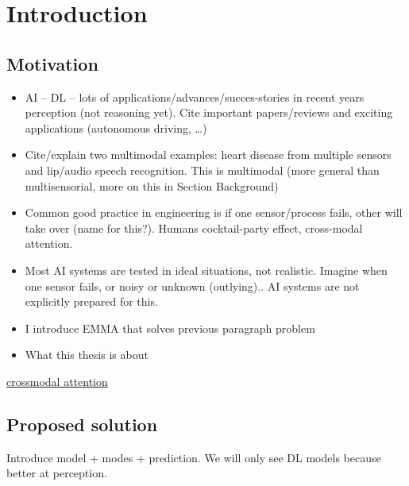 
\chapter{Introduction} 
\label{chapter-1} 


\section{Motivation}

\begin{itemize}
\item AI -- DL -- lots of applications/advances/succes-stories in recent years perception (not reasoning yet). Cite important papers/reviews and exciting applications (autonomous driving, \ldots)
\item Cite/explain two multimodal examples: heart disease from multiple sensors and lip/audio speech recognition. This is multimodal (more general than multisensorial, more on this in Section Background)
\item Common good practice in engineering is if one sensor/process fails, other will take over (name for this?). Humans cocktail-party effect, cross-modal attention.
\item Most AI systems are tested in ideal situations, not realistic. Imagine when one sensor fails, or noisy or unknown (outlying).. AI systems are not explicitly prepared for this.
\item I introduce EMMA that solves previous paragraph problem
\item What this thesis is about
\end{itemize}
\href{http://www.scholarpedia.org/article/Crossmodal_attention}{crossmodal attention}


\section{Proposed solution}

Introduce model + modes + prediction. We will only see DL models because better at perception.

